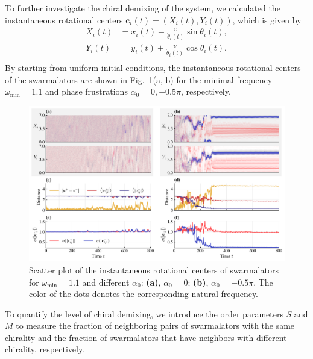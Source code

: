 \documentclass{article}
\begin{document}
To further investigate the chiral demixing of the system, we calculated the instantaneous rotational centers $\mathbf{c}_i\left(t\right)=\left(X_i\left(t\right), Y_i\left(t\right)\right)$, which is given by
\begin{equation}
    \begin{aligned}
        X_i\left( t \right) &=x_i\left( t \right) -\frac{\upsilon}{\dot{\theta}_i\left( t \right)}\sin \theta _i\left( t \right) ,\\
        Y_i\left( t \right) &=y_i\left( t \right) +\frac{\upsilon}{\dot{\theta}_i\left( t \right)}\cos \theta _i\left( t \right) .\\
    \end{aligned}
\end{equation}
By starting from uniform initial conditions, the instantaneous rotational centers of the swarmalators are shown in Fig.~\ref{fig:centersScatterXY}(a, b) for the minimal frequency $\omega_{\min}=1.1$ and phase frustrations $\alpha_0=0, -0.5\pi$, respectively.

\begin{figure}
    \includegraphics[width=\textwidth]{./figs/centersScatterXY.png}
    \caption{
        \label{fig:centersScatterXY} Scatter plot of the instantaneous rotational centers of swarmalators for $\omega_{\min}=1.1$ and different $\alpha_0$: 
        \textbf{(a)}, $\alpha_0=0$; \textbf{(b)}, $\alpha_0=-0.5\pi$.
        The color of the dots denotes the corresponding natural frequency.
    }
\end{figure}

To quantify the level of chiral demixing, we introduce the order parameters $S$ and $M$ to measure the fraction of neighboring pairs of swarmalators with the same chirality and the fraction of swarmalators that have neighbors with different chirality, respectively. 
\end{document}
